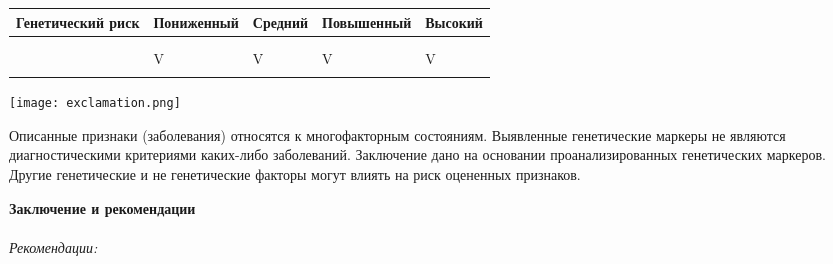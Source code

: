 \documentclass[russian,a4paper,12pt]{article}
\begin{document}
\begin{center}
	\begin{longtable} { |C||p{2.5cm}|p{1.5cm}|p{2.4cm}|p{1.8cm}| }%
		\hline
		Генетический риск & Пониженный  
		& Средний  
		& Повышенный  
		& Высокий \\
		\hline
		
			 \\
			\hline
				\\
				\hline
					&  
					V
					&
					V
					&   
					V
					& 
					V
					\\
					\hline
				

	\end{longtable}
\end{center}

\noindent
\parbox[b][3cm][t]{10mm}{
	\texttt{[image: exclamation.png]}}
\hfill
\parbox[b][3cm][t]{100mm}{
	Описанные признаки (заболевания) относятся к многофакторным состояниям. Выявленные генетические маркеры не являются диагностическими критериями каких-либо заболеваний. Заключение дано на основании проанализированных генетических маркеров. Другие генетические и не генетические факторы могут влиять на риск оцененных признаков.}

\vspace{15mm}

\textbf{Заключение и рекомендации}\\
	\textbf{}\\
	\textit{Рекомендации:}
					\\ 
\end{document}
